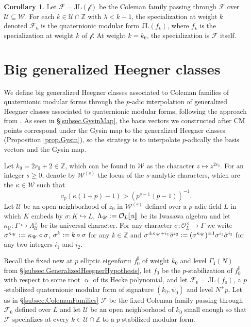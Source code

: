\documentclass[a4paper]{amsart}
\numberwithin{equation}{section}
\theoremstyle{definition}
\newtheorem{corollary}[theorem]{Corollary}
\newcommand{\Z}{\mathbb{Z}}
\newcommand{\defeq}{\vcentcolon=}
\begin{document}
\begin{corollary}\label{cor.QuaternionicColemanFamilies}
Let $\mathscr{F}=\mathrm{JL}(\mathscr{f})$ be the Coleman family passing through $\mathcal{F}$ over $\mathscr{U}\subseteq\mathscr{W}$. For each $k\in\mathscr{U}\cap\Z$ with $\lambda<k-1$, the specialization at weight $k$ denoted $\mathcal{F}_k$ is the quaternionic modular form $\mathrm{JL}(f_k)$, where $f_k$ is the specialization at weight $k$ of $\mathscr{f}$. At weight $k=k_0$, the specialization is $\mathcal{F}$ itself.
\end{corollary}

\section{Big generalized Heegner classes}\label{sec.BigHeegnerClasses}
We define big generalized Heegner classes associated to Coleman families of quaternionic modular forms through the $p$-adic interpolation of generalized Heegner classes associated to quaternionic modular forms, following the approach from \cite[\S 4]{JetchevLoefflerZerbes}. As seen in \S\ref{subsec.GysinMap}, the basis vectors we constructed after CM points correspond under the Gysin map to the generalized Heegner classes (Proposition \ref{prop.Gysin}), so the strategy is to interpolate $p$-adically the basis vectors and the Gysin map.

Let $k_0=2r_0+2\in\Z$, which can be found in $\mathscr{W}$ as the character $z\mapsto z^{2r_0}$. For an integer $s\ge 0$, denote by $\mathscr{W}^{(s)}$ the locus of the $s$-analytic characters, which are the $\kappa\in\mathscr{W}$ such that \[v_p(\kappa(1+p)-1)>(p^{s-1}(p-1))^{-1}.\]
Let $\mathscr{U}$ be an open neighborhood of $z_0$ in $\mathscr{W}^{(s)}$ defined over a $p$-adic field $L$ in which $K$ embeds by $\sigma\colon K\hookrightarrow L$, $\Lambda_\mathscr{U}\defeq \mathcal{O}_L[\![u]\!]$ be its Iwasawa algebra and let $\kappa_{\mathscr{U}}\colon\Gamma\hookrightarrow\Lambda_{\mathscr{U}}^\times$ be its universal character. For any character $\sigma\colon\mathcal{O}_L^\times\to\Gamma$ we write $\sigma^{\kappa_{\mathscr{U}}}\defeq\kappa_{\mathscr{U}}\circ\sigma$, $\sigma^{k}\defeq k\circ\sigma$ for any $k\in\Z$ and $\sigma^{\pm\kappa_\mathscr{U}+i_1}\bar{\sigma}^{i_2}\defeq (\sigma^{\kappa_{\mathscr{U}}})^{\pm 1}\sigma^{i_1}\bar{\sigma}^{i_2}$ for any two integers $i_1$ and $i_2$.

Recall the fixed new at $p$ elliptic eigenform $f_0^\sharp$ of weight $k_0$ and level $\Gamma_1(N)$ from \S\ref{subsec.GeneralizedHeegnerHypothesis}, let $f_0$ be the $p$-stabilization of $f_0^\sharp$ with respect to some root $\upalpha$ of its Hecke polynomial, and let $\mathcal{F}_0=\mathrm{JL}(f_0)$, a $p$-stabilized quaternionic modular form of signature $(k_0,\psi_0)$ and level $N^{+}p$. Let as in \S\ref{subsec.ColemanFamilies} $\mathscr{F}$ be the fixed Coleman family passing through $\mathcal{F}_0$ defined over $L$ and let $\mathscr{U}$ be an open neighborhood of $k_0$ small enough so that $\mathscr{F}$ specializes at every $k\in\mathscr{U}\cap\Z$ to a $p$-stabilized modular form.
\end{document}
